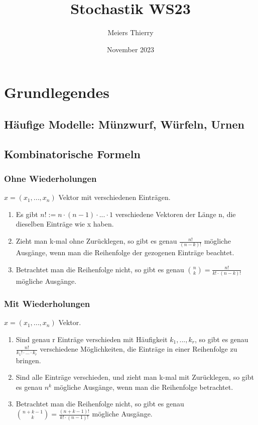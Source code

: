 \documentclass{article}
\title{Stochastik WS23}
\author{Meiers Thierry}
\date{November 2023}
\begin{document}
\maketitle

\section{Grundlegendes}

\subsection{Häufige Modelle: Münzwurf, Würfeln, Urnen}

\subsection{Kombinatorische Formeln}

\subsubsection{Ohne Wiederholungen}
$x = (x_1, ..., x_n)$ Vektor mit verschiedenen Einträgen.
\begin{enumerate}
    \item Es gibt $n!:=n\cdot(n-1)\cdot...\cdot1$ verschiedene Vektoren der Länge n, die dieselben Einträge wie x haben.
    \item Zieht man k-mal ohne Zurücklegen, so gibt es genau $\frac{n!}{(n-k)!}$ mögliche Ausgänge, wenn man die Reihenfolge der gezogenen Einträge beachtet.
    \item Betrachtet man die Reihenfolge nicht, so gibt es genau $\binom{n}{k}=\frac{n!}{k!\cdot(n-k)!}$ mögliche Ausgänge.
\end{enumerate}

\subsubsection{Mit Wiederholungen}
$x = (x_1, ..., x_n)$ Vektor.
\begin{enumerate}
    \item Sind genau r Einträge verschieden mit Häufigkeit $k_1, ..., k_r$, so gibt es genau $\frac{n!}{k_1!\cdot...\cdot k_r}$ verschiedene Möglichkeiten, die Einträge in einer Reihenfolge zu bringen.
    \item Sind alle Einträge verschieden, und zieht man k-mal mit Zurücklegen, so gibt es genau $n^k$ mögliche Ausgänge, wenn man die Reihenfolge betrachtet. 
    \item Betrachtet man die Reihenfolge nicht, so gibt es genau $\binom{n+k-1}{k}=\frac{(n+k-1)!}{k!\cdot(n-1)!}$ mögliche Ausgänge.
\end{enumerate}
\end{document}

